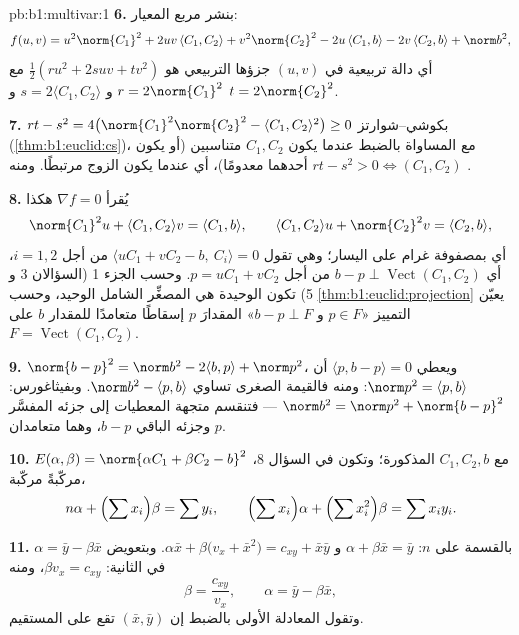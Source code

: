 \begin{solution}{pb:b1:multivar:1}
\textbf{6.} بنشر مربع المعيار:
\[
f(u,v) = u^2\norm{C_1}^2 + 2uv\,\langle C_1, C_2\rangle +
v^2\norm{C_2}^2 - 2u\,\langle C_1, b\rangle - 2v\,\langle C_2,
b\rangle + \norm b^2 ,
\]
أي دالة تربيعية في $(u, v)$ جزؤها التربيعي هو
$\frac12(ru^2 + 2suv + tv^2)$ مع $r = 2\norm{C_1}^2$ و $s =
2\langle C_1, C_2\rangle$ و $t = 2\norm{C_2}^2$.

\textbf{7.} $rt - s^2 = 4\bigl(\norm{C_1}^2\norm{C_2}^2 -
\langle C_1, C_2\rangle^2\bigr) \geq 0$ بكوشي--شوارتز
(\cref{thm:b1:euclid:cs})، مع المساواة بالضبط عندما يكون $C_1, C_2$
متناسبين (أو يكون أحدهما معدومًا)، أي عندما يكون الزوج
مرتبطًا. ومنه $rt - s^2 > 0 \iff (C_1, C_2)$ .

\textbf{8.} يُقرأ $\nabla f = 0$ هكذا
\[
\norm{C_1}^2 u + \langle C_1, C_2\rangle v = \langle C_1,
b\rangle,
\qquad
\langle C_1, C_2\rangle u + \norm{C_2}^2 v = \langle C_2,
b\rangle,
\]
أي  بمصفوفة غرام على اليسار؛ وهي تقول
$\langle uC_1 + vC_2 - b,\ C_i\rangle = 0$ من أجل $i = 1, 2$، أي
$b - p \perp \operatorname{Vect}(C_1, C_2)$ من أجل $p = uC_1 +
vC_2$. وحسب الجزء 1 (السؤالان 3 و 5) تكون  الوحيدة
هي المصغِّر الشامل الوحيد، وحسب
\cref{thm:b1:euclid:projection} يعيّن التمييز «$p \in
F$ و $b - p \perp F$» المقدارَ $p$ إسقاطًا متعامدًا
للمقدار $b$ على $F = \operatorname{Vect}(C_1, C_2)$.

\textbf{9.} $\norm{b - p}^2 = \norm b^2 - 2\langle b, p\rangle +
\norm p^2$، ويعطي $\langle p, b - p\rangle = 0$ أن $\norm p^2 =
\langle p, b\rangle$: ومنه فالقيمة الصغرى تساوي $\norm b^2 - \langle p,
b\rangle$. وبفيثاغورس: $\norm b^2 = \norm p^2 + \norm{b - p}^2$
--- فتنقسم متجهة المعطيات إلى جزئه المفسَّر $p$ وجزئه
الباقي $b - p$، وهما متعامدان.

\textbf{10.} $E(\alpha, \beta) = \norm{\alpha C_1 + \beta C_2 -
b}^2$ مع $C_1, C_2, b$ المذكورة؛ وتكون  في
السؤال 8، مركّبةً مركّبة،
\[
n\alpha + \Bigl(\sum x_i\Bigr)\beta = \sum y_i,
\qquad
\Bigl(\sum x_i\Bigr)\alpha + \Bigl(\sum x_i^2\Bigr)\beta = \sum
x_i y_i .
\]

\textbf{11.} بالقسمة على $n$: $\alpha + \beta\bar x = \bar y$
و $\alpha\bar x + \beta\bigl(v_x + \bar x^2\bigr) = c_{xy} +
\bar x\bar y$. وبتعويض $\alpha = \bar y - \beta\bar x$ في
الثانية: $\beta v_x = c_{xy}$، ومنه
\[
\beta = \frac{c_{xy}}{v_x}, \qquad \alpha = \bar y - \beta\bar
x ,
\]
وتقول المعادلة الأولى بالضبط إن $(\bar x, \bar y)$
تقع على المستقيم.


\end{solution}
